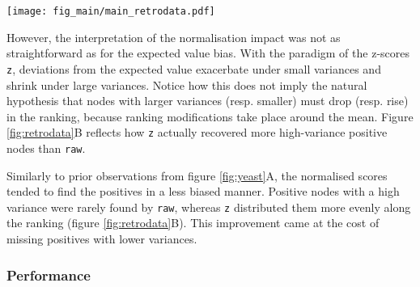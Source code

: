 \documentclass[final]{bioinfo}
\newcommand{\method}{\texttt}
\newcommand{\vbias}{b_{\sigma^2}^{\mathcal{K}}}
\begin{document}
\begin{figure*}[!tpb]%
\centerline{
\texttt{[image: fig\_main/main\_retrodata.pdf]}
}
\caption{Analysis of the prospective dataset.
\textbf{(A)} Pathway-wise comparison of new genes against the remaining genes outside the pathway, in terms of $\vbias$. 
Several pathways showed significant differences in both directions (two-sided Wilcoxon test). 
The $x$ axis was jittered for clarity.
\textbf{(B)} Ranking of the positives using \method{raw} and \method{z}. 
Each data point is the relative ranking of a positive gene in one of the pathways, i.e. before computing pathway-level metrics. 
Lines correspond to a quasi-logistic fit with a 0.95 confidence interval.
\method{raw} scores were more sensitive at low standard deviations, whereas \method{z} stood more uniform.
\textbf{(C)} Coefficients of the model $\mathrm{AUROC} \sim \mathrm{method} + \mathrm{method:path\_var\_ref}$ with a 0.95 confidence interval, where the interaction term involved the variance bias. 
The main effect of \method{raw} was not depicted because it was the reference level of \texttt{method}. 
\textbf{(D)} Predicted AUROC across all the pathways, as a function of the bias. 
\method{z} was less sensitive to the bias, due to its interaction term in \textbf{(C)} being closer to 0.
Lines correspond to a quasi-logistic fit with a 0.95 confidence interval.
}\label{fig:retrodata}
\end{figure*}

However, the interpretation of the normalisation impact was not as straightforward as for the expected value bias. 
With the paradigm of the z-scores \method{z}, deviations from the expected value exacerbate under small variances and shrink under large variances. 
Notice how this does not imply the natural hypothesis that nodes with larger variances (resp. smaller) must drop (resp. rise) in the ranking, because ranking modifications take place around the mean. 
Figure \ref{fig:retrodata}B reflects how \method{z} actually recovered more high-variance positive nodes than \method{raw}.

Similarly to prior observations from figure \ref{fig:yeast}A, the normalised scores tended to find the positives in a less biased manner. 
Positive nodes with a high variance were rarely found by \method{raw}, whereas \method{z} distributed them more evenly along the ranking (figure \ref{fig:retrodata}B).
This improvement came at the cost of missing positives with lower variances. 

\subsubsection*{Performance}
\end{document}
